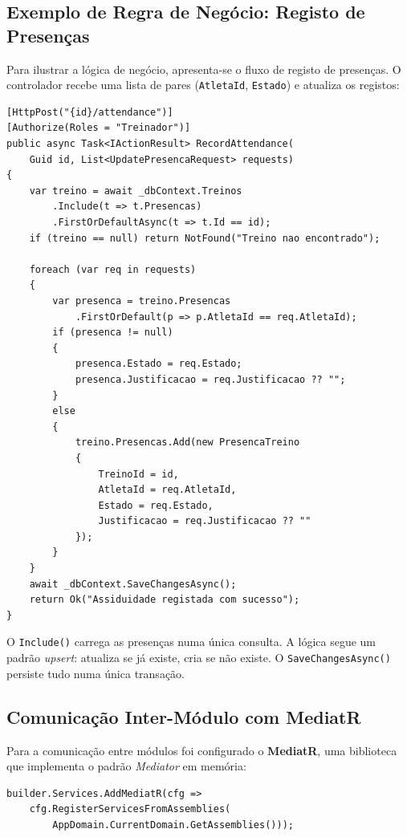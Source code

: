\subsection{Exemplo de Regra de Negócio: Registo de Presenças}

Para ilustrar a lógica de negócio, apresenta-se o fluxo de registo de presenças. O controlador recebe uma lista de pares (\texttt{AtletaId}, \texttt{Estado}) e atualiza os registos:

\begin{lstlisting}[language={[Sharp]C},basicstyle=\ttfamily\small,breaklines=true,frame=single,caption={Registo de presenças com validação de treino existente.},label={lst:attendance}]
[HttpPost("{id}/attendance")]
[Authorize(Roles = "Treinador")]
public async Task<IActionResult> RecordAttendance(
    Guid id, List<UpdatePresencaRequest> requests)
{
    var treino = await _dbContext.Treinos
        .Include(t => t.Presencas)
        .FirstOrDefaultAsync(t => t.Id == id);
    if (treino == null) return NotFound("Treino nao encontrado");

    foreach (var req in requests)
    {
        var presenca = treino.Presencas
            .FirstOrDefault(p => p.AtletaId == req.AtletaId);
        if (presenca != null)
        {
            presenca.Estado = req.Estado;
            presenca.Justificacao = req.Justificacao ?? "";
        }
        else
        {
            treino.Presencas.Add(new PresencaTreino
            {
                TreinoId = id,
                AtletaId = req.AtletaId,
                Estado = req.Estado,
                Justificacao = req.Justificacao ?? ""
            });
        }
    }
    await _dbContext.SaveChangesAsync();
    return Ok("Assiduidade registada com sucesso");
}
\end{lstlisting}

O \texttt{Include()} carrega as presenças numa única consulta. A lógica segue um padrão \textit{upsert}: atualiza se já existe, cria se não existe. O \texttt{SaveChangesAsync()} persiste tudo numa única transação.

\subsection{Comunicação Inter-Módulo com MediatR}

Para a comunicação entre módulos foi configurado o \textbf{MediatR}, uma biblioteca que implementa o padrão \textit{Mediator} em memória:

\begin{lstlisting}[language={[Sharp]C},basicstyle=\ttfamily\small,breaklines=true,frame=single,caption={Configuração do MediatR para comunicação inter-módulo.},label={lst:mediatr}]
builder.Services.AddMediatR(cfg =>
    cfg.RegisterServicesFromAssemblies(
        AppDomain.CurrentDomain.GetAssemblies()));
\end{lstlisting}

